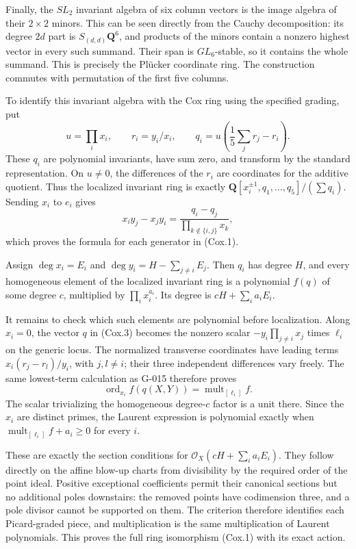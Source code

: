 \documentclass[
  10pt,
]{article}
\begin{document}
Finally, the \(SL_2\) invariant algebra of six column vectors is the
image algebra of their \(2\times2\) minors. This can be seen directly
from the Cauchy decomposition: its degree \(2d\) part is
\(S_{(d,d)}\mathbf Q^6\), and products of the minors contain a nonzero
highest vector in every such summand. Their span is \(GL_6\)-stable, so
it contains the whole summand. This is precisely the Plücker coordinate
ring. The construction commutes with permutation of the first five
columns.

To identify this invariant algebra with the Cox ring using the specified
grading, put \[
u=\prod_i x_i,\qquad r_i=y_i/x_i,\qquad
q_i=u\left(\frac15\sum_jr_j-r_i\right).
\tag{Cox.3}
\] These \(q_i\) are polynomial invariants, have sum zero, and transform
by the standard representation. On \(u\ne0\), the differences of the
\(r_i\) are coordinates for the additive quotient. Thus the localized
invariant ring is exactly
\(\mathbf Q[x_i^{\pm1},q_1,\ldots,q_5]/(\sum q_i)\). Sending \(x_i\) to
\(e_i\) gives \[
x_i y_j-x_j y_i
=\frac{q_i-q_j}{\prod_{k\notin\{i,j\}}x_k},
\] which proves the formula for each generator in (Cox.1).

Assign \(\deg x_i=E_i\) and \(\deg y_i=H-\sum_{j\ne i}E_j\). Then
\(q_i\) has degree \(H\), and every homogeneous element of the localized
invariant ring is a polynomial \(f(q)\) of some degree \(c\), multiplied
by \(\prod_i x_i^{a_i}\). Its degree is \(cH+\sum_i a_iE_i\).

It remains to check which such elements are polynomial before
localization. Along \(x_i=0\), the vector \(q\) in (Cox.3) becomes the
nonzero scalar \(-y_i\prod_{j\ne i}x_j\) times \(\ell_i\) on the generic
locus. The normalized transverse coordinates have leading terms
\(x_i(r_j-r_l)/y_i\), with \(j,l\ne i\); their three independent
differences vary freely. The same lowest-term calculation as G-015
therefore proves \[
\operatorname{ord}_{x_i}f(q(X,Y))
=\operatorname{mult}_{[\ell_i]}f.
\] The scalar trivializing the homogeneous degree-\(c\) factor is a unit
there. Since the \(x_i\) are distinct primes, the Laurent expression is
polynomial exactly when \(\operatorname{mult}_{[\ell_i]}f+a_i\ge0\) for
every \(i\).

These are exactly the section conditions for
\(\mathcal O_X(cH+\sum_i a_iE_i)\). They follow directly on the affine
blow-up charts from divisibility by the required order of the point
ideal. Positive exceptional coefficients permit their canonical sections
but no additional poles downstairs: the removed points have codimension
three, and a pole divisor cannot be supported on them. The criterion
therefore identifies each Picard-graded piece, and multiplication is the
same multiplication of Laurent polynomials. This proves the full ring
isomorphism (Cox.1) with its exact action.
\end{document}

